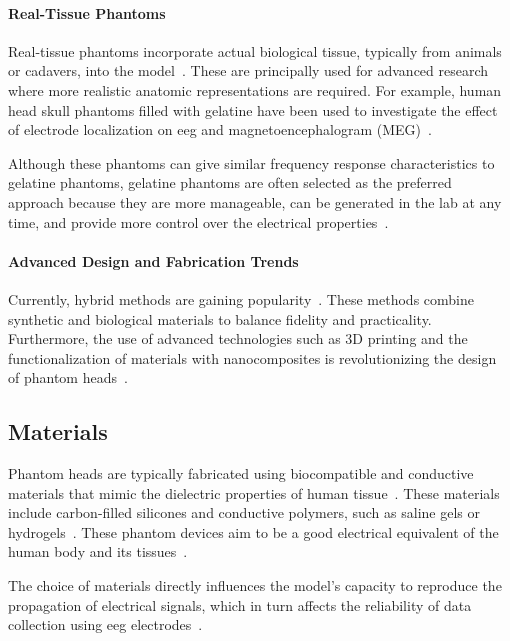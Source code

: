 \paragraph*{Real-Tissue Phantoms}

Real-tissue phantoms incorporate actual biological tissue, typically from animals or cadavers, into the model~\cite{Owda2020, 9475461}. These are principally used for advanced research where more realistic anatomic representations are required. For example, human head skull phantoms filled with gelatine have been used to investigate the effect of electrode localization on \gls{eeg} and magnetoencephalogram (MEG)~\cite{9475461}.

Although these phantoms can give similar frequency response characteristics to gelatine phantoms, gelatine phantoms are often selected as the preferred approach because they are more manageable, can be generated in the lab at any time, and provide more control over the electrical properties~\cite{9475461}.

\paragraph*{Advanced Design and Fabrication Trends}

Currently, hybrid methods are gaining popularity~\cite{9475461}. These methods combine synthetic and biological materials to balance fidelity and practicality. Furthermore, the use of advanced technologies such as 3D printing and the functionalization of materials with nanocomposites is revolutionizing the design of phantom heads~\cite{akor-2025}.

\subsection{Materials}\label{subsec:phantom_materials}

Phantom heads are typically fabricated using biocompatible and conductive materials that mimic the dielectric properties of human tissue~\cite{Collier2012}. These materials include carbon-filled silicones and conductive polymers, such as saline gels or hydrogels~\cite{Owda2020}. These phantom devices aim to be a good electrical equivalent of the human body and its tissues~\cite{9475461}.

The choice of materials directly influences the model's capacity to reproduce the propagation of electrical signals, which in turn affects the reliability of data collection using \gls{eeg} electrodes~\cite{akor-2025}.

